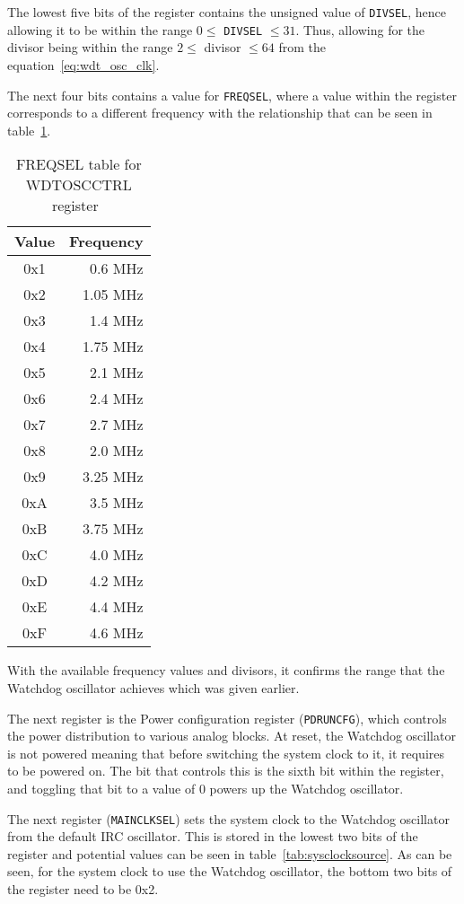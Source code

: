 The lowest five bits of the register contains the unsigned value of \verb|DIVSEL|, hence allowing it to be within the range $ 0 \leq $ \verb|DIVSEL| $ \leq 31$. Thus, allowing for the divisor being within the range $ 2 \leq $ divisor $ \leq 64$ from the equation~\ref{eq:wdt_osc_clk}.

The next four bits contains a value for \verb|FREQSEL|, where a value within the register corresponds to a different frequency with the relationship that can be seen in table~\ref{tab:freqsel}.

\begin{table}
	\centering
	\begin{tabular}{|c|r|}
		\hline
		Value & Frequency \\
		\hline
		0x1 & 0.6 MHz \\
		0x2 & 1.05 MHz \\
		0x3 & 1.4 MHz \\
		0x4 & 1.75 MHz \\
		0x5 & 2.1 MHz \\
		0x6 & 2.4 MHz \\
		0x7 & 2.7 MHz \\
		0x8 & 2.0 MHz \\
		0x9 & 3.25 MHz \\
		0xA & 3.5 MHz \\
		0xB & 3.75 MHz \\
		0xC & 4.0 MHz \\
		0xD & 4.2 MHz \\
		0xE & 4.4 MHz \\
		0xF & 4.6 MHz \\
		\hline
	\end{tabular}
	\caption{FREQSEL table for WDTOSCCTRL register~\cite{mbed_datasheet}}
	\label{tab:freqsel}
\end{table}

With the available frequency values and divisors, it confirms the range that the Watchdog oscillator achieves which was given earlier.

The next register is the Power configuration register (\verb|PDRUNCFG|), which controls the power distribution to various analog blocks. At reset, the Watchdog oscillator is not powered meaning that before switching the system clock to it, it requires to be powered on. The bit that controls this is the sixth bit within the register, and toggling that bit to a value of 0 powers up the Watchdog oscillator. 

The next register (\verb|MAINCLKSEL|) sets the system clock to the Watchdog oscillator from the default IRC oscillator. This is stored in the lowest two bits of the register and potential values can be seen in table~\ref{tab:sysclocksource}. As can be seen, for the system clock to use the Watchdog oscillator, the bottom two bits of the register need to be 0x2.

